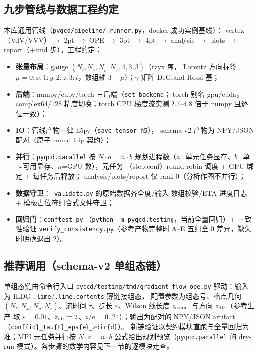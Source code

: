 \documentclass[11pt,a4paper]{ctexart}
\newcommand{\eps}{\varepsilon}
\newcommand{\code}[1]{\texttt{#1}}
\newcommand{\zzh}{\widehat{\tau}}
\begin{document}
\subsection{九步管线与数据工程约定}

本库通用管线（\code{pyqcd/pipeline/\_runner.py}，docker 成功实例基线）：
vertex（VdV/VVV）$\to$ 2pt $\to$ OPE $\to$ 3pt $\to$ 4pt $\to$ analysis
$\to$ plots $\to$ report（+tmd 步）。工程约定：
\begin{itemize}
  \item \textbf{张量布局}：gauge $(N_t,N_z,N_y,N_x,4,3,3)$（tzyx 序，
  Lorentz 方向标签 $\mu=0\!:\!x,1\!:\!y,2\!:\!z,3\!:\!t$，数组轴
  $3-\mu$）；$\gamma$ 矩阵 DeGrand-Rossi 基；
  \item \textbf{后端}：numpy/cupy/torch 三后端（\code{set\_backend}；
  torch 别名 gpu/cuda，complex64/128 精度切换；torch CPU 梯度流实测
  2.7--4.8 倍于 numpy 且逐位一致）；
  \item \textbf{IO}：管线产物一律 h5py（\code{save\_tensor\_h5}），
  schema-v2 产物为 NPY/JSON 配对（原子 round-trip 契约）；
  \item \textbf{并行}：\code{pyqcd.parallel} 按 $N\!\cdot\!a=n\!\cdot\!b$
  规划进程数（$a$=单元任务显存、$b$=单卡可用显存、$n$=GPU 数），元任务
  （step,conf）round-robin 调度 + GPU 绑定 + 每任务后释放；
  analysis/plots/report 仅 rank 0（分析作图不并行）；
  \item \textbf{数据守卫}：\code{\_validate.py} 的原始数据齐全度/输入
  数组校验/ETA 进度日志 + 模板占位符组合式文件守卫；
  \item \textbf{回归门}：\code{conftest.py}
  （\code{python -m pyqcd.testing}，当前全量回归）+ 一致性验证
  \code{verify\_consistency.py}（参考产物完整时 A--E 五组全
  0 差异，缺失时明确退出 2）。
\end{itemize}

\subsection{推荐调用（schema-v2 单组态链）}

单组态链由命令行入口 \code{pyqcd/testing/tmd/gradient\_flow\_ope.py}
驱动：输入为 ILDG \code{.lime}/\code{.lime.contents} 薄链接组态，
配置参数为组态号、格点几何 $(N_t,N_x,N_y,N_z)$、流时间 $\zzh$、步长
$\eps$、Wilson 线长度 $z_{\rm count}$ 与方向 $z_{\rm dir}$（参考生产
取 $\eps=0.01$、$z_{\rm dir}=2$、$z/a=0..24$）；输出为配对的
NPY/JSON artifact（\code{conf\{id\}\_tau\{t\}\_eps\{e\}\_zdir\{d\}}）。
新链验证以契约模块直跑与全量回归为准；MPI 元任务并行按
$N\cdot a=n\cdot b$ 公式给出规划预览（\code{pyqcd.parallel} 的
dry-run 模式）。各步骤的数学内容见下一节的逐模块走查。
\end{document}
